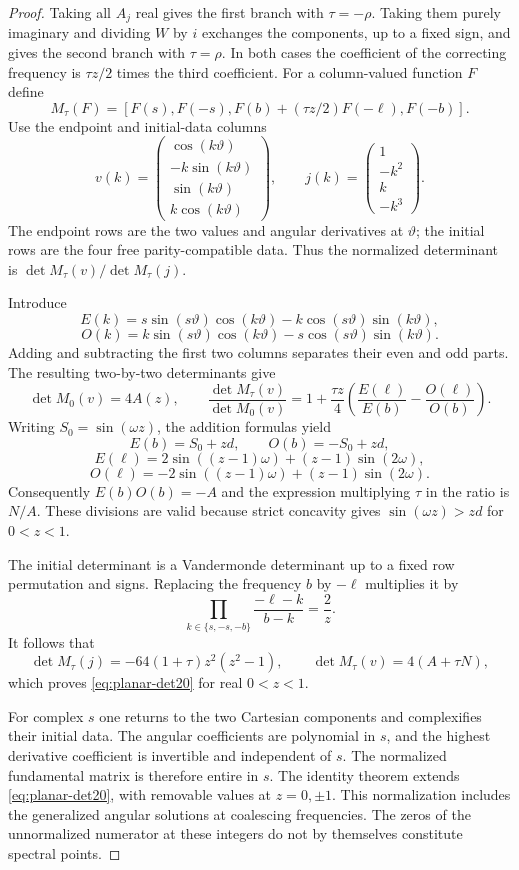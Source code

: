 \documentclass[11pt,a4paper]{article}
\theoremstyle{remark}
\numberwithin{equation}{section}
\begin{document}
\begin{proof}
Taking all $A_j$ real gives the first branch with $\tau=-\rho$.
Taking them purely imaginary and dividing $W$ by $i$ exchanges the
components, up to a fixed sign, and gives the second branch with
$\tau=\rho$. In both cases the coefficient of the correcting frequency
is $\tau z/2$ times the third coefficient. For a column-valued function $F$
define
\[
 M_\tau(F)=
 [F(s),F(-s),F(b)+(\tau z/2)F(-\ell),F(-b)].
\]
Use the endpoint and initial-data columns
\[
 v(k)=\begin{pmatrix}
 \cos(k\vartheta)\\-k\sin(k\vartheta)\\
 \sin(k\vartheta)\\k\cos(k\vartheta)
 \end{pmatrix},
 \qquad
 j(k)=\begin{pmatrix}1\\-k^2\\k\\-k^3\end{pmatrix}.
\]
The endpoint rows are the two values and angular derivatives at
$\vartheta$; the initial rows are the four free parity-compatible data.
Thus the normalized determinant is $\det M_\tau(v)/\det M_\tau(j)$.

Introduce
\[
 E(k)=s\sin(s\vartheta)\cos(k\vartheta)
       -k\cos(s\vartheta)\sin(k\vartheta),
\]
\[
 O(k)=k\sin(s\vartheta)\cos(k\vartheta)
       -s\cos(s\vartheta)\sin(k\vartheta).
\]
Adding and subtracting the first two columns separates their even and odd
parts. The resulting two-by-two determinants give
\[
 \det M_0(v)=4A(z),\qquad
 \frac{\det M_\tau(v)}{\det M_0(v)}
 =1+\frac{\tau z}{4}
 \left(\frac{E(\ell)}{E(b)}-\frac{O(\ell)}{O(b)}\right).
\]
Writing $S_0=\sin(\omega z)$, the addition formulas yield
\[
 E(b)=S_0+zd,\qquad O(b)=-S_0+zd,
\]
\[
 E(\ell)=2\sin((z-1)\omega)+(z-1)\sin(2\omega),
\]
\[
 O(\ell)=-2\sin((z-1)\omega)+(z-1)\sin(2\omega).
\]
Consequently $E(b)O(b)=-A$ and the expression multiplying $\tau$ in the
ratio is $N/A$. These divisions are valid because strict concavity gives
$\sin(\omega z)>zd$ for $0<z<1$.

The initial determinant is a Vandermonde determinant up to a fixed row
permutation and signs. Replacing the frequency $b$ by $-\ell$ multiplies
it by
\[
 \prod_{k\in\{s,-s,-b\}}\frac{-\ell-k}{b-k}=\frac2z.
\]
It follows that
\[
 \det M_\tau(j)=-64(1+\tau)z^2(z^2-1),
 \qquad \det M_\tau(v)=4(A+\tau N),
\]
which proves \eqref{eq:planar-det20} for real $0<z<1$.

For complex $s$ one returns to the two Cartesian components and complexifies
their initial data. The angular coefficients are polynomial in $s$, and the
highest derivative coefficient is invertible and independent of $s$.
The normalized fundamental matrix is therefore entire in $s$. The identity
theorem extends \eqref{eq:planar-det20}, with removable values at
$z=0,\pm1$. This normalization includes the generalized angular solutions
at coalescing frequencies. The zeros of the unnormalized numerator at these
integers do not by themselves constitute spectral points.


\end{proof}
\end{document}
